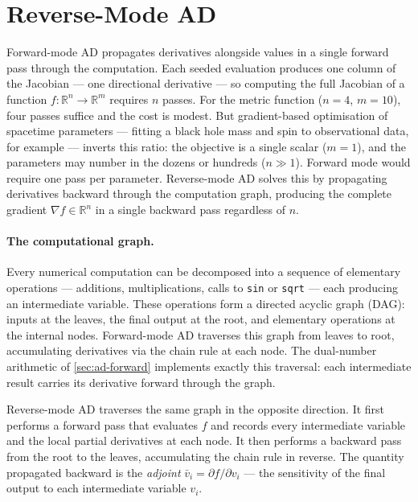 \section{Reverse-Mode AD\starmark{}}
\label{sec:ad-reverse}

Forward-mode AD propagates derivatives alongside values in a
single forward pass through the computation.  Each seeded
evaluation produces one column of the Jacobian --- one
directional derivative --- so computing the full Jacobian of
a function $f : \mathbb{R}^n \to \mathbb{R}^m$ requires $n$
passes.  For the metric function ($n = 4$, $m = 10$), four
passes suffice and the cost is modest.  But gradient-based
optimisation of spacetime parameters --- fitting a black hole
mass and spin to observational data, for example --- inverts
this ratio: the objective is a single scalar ($m = 1$), and
the parameters may number in the dozens or hundreds ($n \gg 1$).
Forward mode would require one pass per parameter.
Reverse-mode AD solves this by propagating derivatives
backward through the computation graph, producing the
complete gradient $\nabla f \in \mathbb{R}^n$ in a single
backward pass regardless of $n$.

\paragraph{The computational graph.}

Every numerical computation can be decomposed into a sequence
of elementary operations --- additions, multiplications, calls
to \texttt{sin} or \texttt{sqrt} --- each producing an
intermediate variable.  These operations form a directed
acyclic graph (DAG): inputs at the leaves, the final output
at the root, and elementary operations at the internal nodes.
Forward-mode AD traverses this graph from leaves to root,
accumulating derivatives via the chain rule at each node.
The dual-number arithmetic of \cref{sec:ad-forward}
implements exactly this traversal: each intermediate result
carries its derivative forward through the graph.

Reverse-mode AD traverses the same graph in the opposite
direction.  It first performs a forward pass that evaluates
$f$ and records every intermediate variable and the local
partial derivatives at each node.  It then performs a
backward pass from the root to the leaves, accumulating the
chain rule in reverse.  The quantity propagated backward is
the \emph{adjoint} $\bar{v}_i = \partial f / \partial v_i$
--- the sensitivity of the final output to each intermediate
variable $v_i$.

